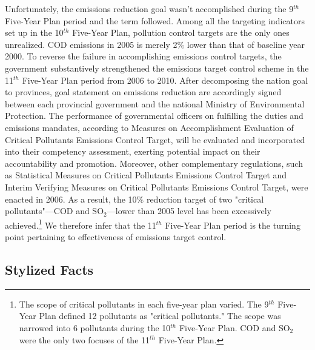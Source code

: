 \documentclass[12pt,english]{article}
\begin{document}
Unfortunately, the emissions reduction goal wasn't accomplished during the 9$^{th}$ Five-Year Plan period and the term followed. Among all the targeting indicators set up in the 10$^{th}$ Five-Year Plan, pollution control targets are the only ones unrealized. COD emissions in 2005 is merely 2$\%$ lower than that of baseline year 2000. To reverse the failure in accomplishing emissions control targets, the government substantively strengthened the emissions target control scheme in the 11$^{th}$ Five-Year Plan period from 2006 to 2010. After decomposing the nation goal to provinces, goal statement on emissions reduction are accordingly signed between each provincial government and the national Ministry of Environmental Protection. The performance of governmental officers on fulfilling the duties and emissions mandates, according to Measures on Accomplishment Evaluation of Critical Pollutants Emissions Control Target, will be evaluated and incorporated into their competency assessment, exerting potential impact on their accountability and promotion. Moreover, other complementary regulations, such as Statistical Measures on Critical Pollutants Emissions Control Target and Interim Verifying Measures on Critical Pollutants Emissions Control Target, were enacted in 2006. As a result, the 10$\%$ reduction target of two "critical pollutants"---COD and SO$_{2}$---lower than 2005 level has been excessively achieved.\footnote{The scope of critical pollutants in each five-year plan varied. The 9$^{th}$ Five-Year Plan defined 12 pollutants as "critical pollutants." The scope was narrowed into 6 pollutants during the 10$^{th}$ Five-Year Plan. COD and SO$_{2}$ were the only two focuses of the 11$^{th}$ Five-Year Plan.} We therefore infer that the 11$^{th}$ Five-Year Plan period is the turning point pertaining to effectiveness of emissions target control. %

\subsection{Stylized Facts}\label{sec:facts}
\end{document}
